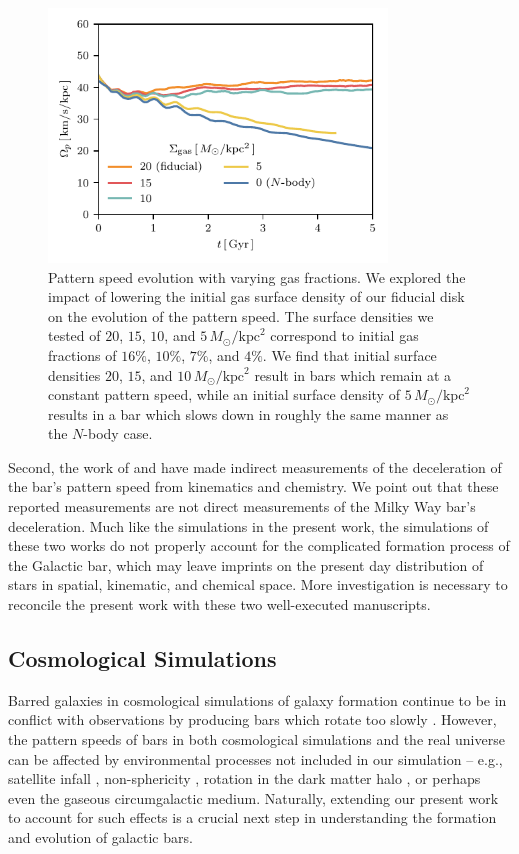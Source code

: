 \documentclass[fleqn,usenatbib]{mnras}
\newcommand{\Nbody}{$N$-body}
\newcommand{\Msun}{\ensuremath{M_{\odot}}}
\begin{document}
\begin{figure}
    \centering
    \includegraphics[width=9cm]{fig/ps_fgas.pdf}
    \caption{Pattern speed evolution with varying gas fractions. We explored the
    impact of lowering the initial gas surface density of our fiducial disk on
    the evolution of the pattern speed. The surface densities we tested of $20$,
    $15$, $10$, and $5\,\Msun/\textrm{kpc}^2$ correspond to initial gas
    fractions of $16\%$, $10\%$, $7\%$, and $4\%$. We find that initial surface
    densities $20$, $15$, and $10\,\Msun/\textrm{kpc}^2$ result in bars which
    remain at a constant pattern speed, while an initial surface density of
    $5\,\Msun/\textrm{kpc}^2$ results in a bar which slows down in roughly the
    same manner as the \Nbody{} case.}
    \label{fig:fgas}
\end{figure}

Second, the work of \citet{2021MNRAS.500.4710C} and \citet{2021MNRAS.505.2412C}
have made indirect measurements of the deceleration of the bar's pattern speed
from kinematics and chemistry. We point out that these reported measurements are
not direct measurements of the Milky Way bar's deceleration. Much like the
simulations in the present work, the simulations of these two works do not
properly account for the complicated formation process of the Galactic bar,
which may leave imprints on the present day distribution of stars in spatial,
kinematic, and chemical space. More investigation is necessary to reconcile the
present work with these two well-executed manuscripts.

\subsection{Cosmological Simulations}
Barred galaxies in cosmological simulations of galaxy formation continue to be
in conflict with observations by producing bars which rotate too slowly
\citep{2017MNRAS.469.1054A, 2019MNRAS.483.2721P, 2021AA...650L..16F}. However,
the pattern speeds of bars in both cosmological simulations and the real
universe can be affected by environmental processes not included in our
simulation -- e.g., satellite infall \citep{2011Natur.477..301P}, non-sphericity
\citep{2013MNRAS.429.1949A}, rotation in the dark matter halo
\citep{2013MNRAS.434.1287S, 2014ApJ...783L..18L, 2018MNRAS.476.1331C,
2019MNRAS.488.5788C}, or perhaps even the gaseous circumgalactic medium.
Naturally, extending our present work to account for such effects is a crucial
next step in understanding the formation and evolution of galactic bars.
\end{document}
